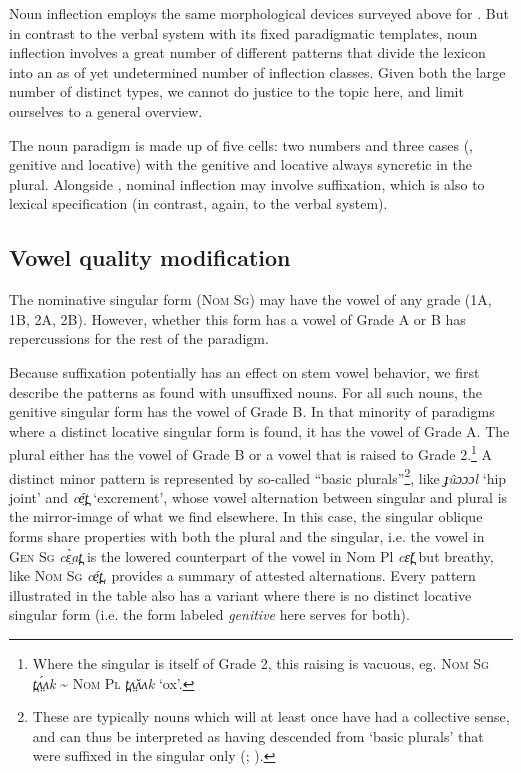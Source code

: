 \documentclass[output=paper,newtxmath,modfonts,nonflat]{langsci/langscibook}
\begin{document}
Noun inflection employs the same morphological devices surveyed above for . But in contrast to the verbal system with its fixed paradigmatic templates, noun inflection involves a great number of different patterns that divide the lexicon into an as of yet undetermined number of inflection classes. Given both the large number of distinct types, we cannot do justice to the topic here, and limit ourselves to a general overview.

The noun paradigm is made up of five cells: two numbers and three cases (, genitive and locative) with the genitive and locative always syncretic in the plural. Alongside , nominal inflection may involve suffixation, which is also  to lexical specification (in contrast, again, to the verbal system). 

\subsection{Vowel quality modification} 

The nominative singular form (\textsc{Nom Sg}) may have the vowel of any grade (1A, 1B, 2A, 2B). However, whether this form has a vowel of Grade A or B has repercussions for the rest of the paradigm. 

Because suffixation potentially has an effect on stem vowel behavior, we first describe the patterns as found with unsuffixed nouns. For all such nouns, the genitive singular form has the vowel of Grade B. In that minority of paradigms where a distinct locative singular form is found, it has the vowel of Grade A. The plural either has the vowel of Grade B or a vowel that is raised to Grade 2.\footnote{Where the singular is itself of Grade 2, this raising is vacuous, eg. \textsc{Nom Sg} \textit{t̪ʌ̤́ʌk} {\textasciitilde} \textsc{Nom Pl} \textit{t̪ʌ̤̌ʌʌk} ‘ox’.}  A distinct minor pattern is represented by so-called “basic plurals”\footnote{These are typically nouns which will at least once have had a collective sense, and can thus be interpreted as having descended from ‘basic plurals’ that were suffixed in the singular only (\citealt{Storch2005}; \citealt{Dimmendaal2000}).}, like \textit{ɟûɔɔɔl} ‘hip joint’ and \textit{cé̤t̪} ‘excrement’, whose vowel alternation between  singular and plural is the mirror-image of what we find elsewhere. In this case, the singular oblique forms share properties with both the  plural and the  singular, i.e. the vowel in \textsc{Gen Sg} \textit{cɛ̤̀at̪} is the lowered counterpart of the vowel in Nom Pl \textit{cɛ̌t̪} but breathy, like \textsc{Nom Sg} \textit{cé̤t̪}.  provides a summary of attested  alternations. Every pattern illustrated in the table also has a variant where there is no distinct locative singular form (i.e. the form labeled \textit{genitive} here serves for both).
\end{document}
